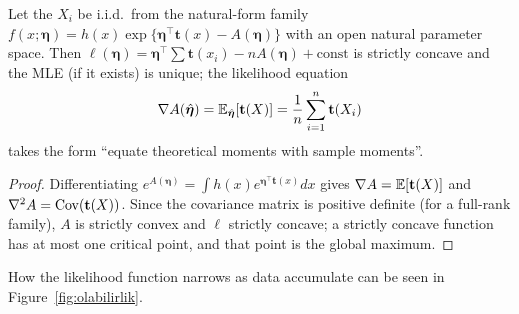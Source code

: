 \documentclass[main.tex]{subfiles}
\begin{document}
\begin{theorem}\label{thm:ustel-mle}
Let the $X_i$ be i.i.d.\ from the natural-form family $f(x;\bm\eta)=h(x)\exp\{\bm\eta^\top\mathbf t(x)-A(\bm\eta)\}$ with an open natural parameter space. Then $\ell(\bm\eta)=\bm\eta^\top\sum\mathbf t(x_i)-nA(\bm\eta)+\text{const}$ is strictly concave and the MLE (if it exists) is unique; the likelihood equation
\[
\nabla A(\hat{\bm\eta})=\mathbb{E}_{\hat{\bm\eta}}[\mathbf t(X)]=\frac1n\sum_{i=1}^n\mathbf t(X_i)
\]
takes the form ``equate theoretical moments with sample moments''.
\end{theorem}
\begin{proof}
Differentiating $e^{A(\bm\eta)}=\int h(x)e^{\bm\eta^\top\mathbf t(x)}dx$ gives $\nabla A=\mathbb{E}[\mathbf t(X)]$ and $\nabla^2A=\operatorname{Cov}(\mathbf t(X))$. Since the covariance matrix is positive definite (for a full-rank family), $A$ is strictly convex and $\ell$ strictly concave; a strictly concave function has at most one critical point, and that point is the global maximum.
\end{proof}

How the likelihood function narrows as data accumulate can be seen in Figure~\ref{fig:olabilirlik}.
\end{document}
